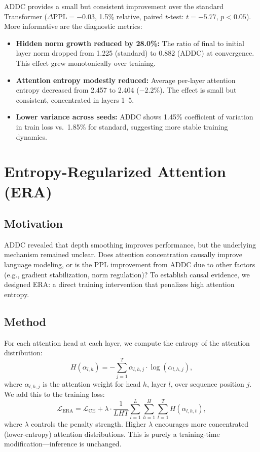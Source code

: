 \documentclass[10pt]{article}
\begin{document}
ADDC provides a small but consistent improvement over the standard Transformer ($\Delta\text{PPL} = -0.03$, 1.5\% relative, paired $t$-test: $t=-5.77$, $p<0.05$). More informative are the diagnostic metrics:

\begin{itemize}[leftmargin=*,itemsep=2pt]
    \item \textbf{Hidden norm growth reduced by 28.0\%:} The ratio of final to initial layer norm dropped from 1.225 (standard) to 0.882 (ADDC) at convergence. This effect grew monotonically over training.
    \item \textbf{Attention entropy modestly reduced:} Average per-layer attention entropy decreased from 2.457 to 2.404 ($-2.2\%$). The effect is small but consistent, concentrated in layers 1--5.
    \item \textbf{Lower variance across seeds:} ADDC shows 1.45\% coefficient of variation in train loss vs.\ 1.85\% for standard, suggesting more stable training dynamics.
\end{itemize}

\section{Entropy-Regularized Attention (ERA)}
\label{sec:era}

\subsection{Motivation}

ADDC revealed that depth smoothing improves performance, but the underlying mechanism remained unclear. Does attention concentration causally improve language modeling, or is the PPL improvement from ADDC due to other factors (e.g., gradient stabilization, norm regulation)? To establish causal evidence, we designed ERA: a direct training intervention that penalizes high attention entropy.

\subsection{Method}

For each attention head at each layer, we compute the entropy of the attention distribution:
\begin{equation}
    H(\alpha_{l,h}) = -\sum_{j=1}^{T} \alpha_{l,h,j} \cdot \log(\alpha_{l,h,j}),
    \label{eq:entropy}
\end{equation}
where $\alpha_{l,h,j}$ is the attention weight for head $h$, layer $l$, over sequence position $j$. We add this to the training loss:
\begin{equation}
    \mathcal{L}_{\text{ERA}} = \mathcal{L}_{\text{CE}} + \lambda \cdot \frac{1}{L H T} \sum_{l=1}^{L} \sum_{h=1}^{H} \sum_{t=1}^{T} H(\alpha_{l,h,t}),
    \label{eq:era_loss}
\end{equation}
where $\lambda$ controls the penalty strength. Higher $\lambda$ encourages more concentrated (lower-entropy) attention distributions. This is purely a training-time modification---inference is unchanged.
\end{document}
